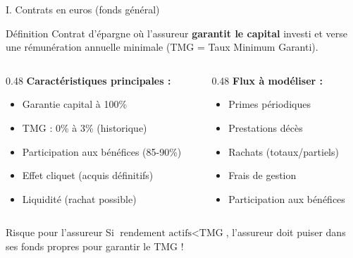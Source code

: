 \documentclass[10pt,aspectratio=169]{beamer}
\newcommand{\highlight}[1]{\textbf{\color{rougeactu}#1}}
\newcommand{\TMG}{\text{TMG}}
\begin{document}
\begin{frame}{I. Contrats en euros (fonds général)}
\begin{block}{Définition}
Contrat d'épargne où l'assureur \highlight{garantit le capital} investi et verse une rémunération annuelle minimale (TMG = Taux Minimum Garanti).
\end{block}

\begin{columns}[T]
\begin{column}{0.48\textwidth}
\textbf{Caractéristiques principales :}
\begin{itemize}
    \item Garantie capital à 100\%
    \item TMG : 0\% à 3\% (historique)
    \item Participation aux bénéfices (85-90\%)
    \item Effet cliquet (acquis définitifs)
    \item Liquidité (rachat possible)
\end{itemize}
\end{column}
\begin{column}{0.48\textwidth}
\textbf{Flux à modéliser :}
\begin{itemize}
    \item[$+$] Primes périodiques
    \item[$-$] Prestations décès
    \item[$-$] Rachats (totaux/partiels)
    \item[$-$] Frais de gestion
    \item[$-$] Participation aux bénéfices
\end{itemize}
\end{column}
\end{columns}

\vspace{0.3cm}
\begin{alertblock}{Risque pour l'assureur}
Si $\text{rendement actifs} < \TMG$, l'assureur doit puiser dans ses fonds propres pour garantir le TMG !
\end{alertblock}
\end{frame}
\end{document}
